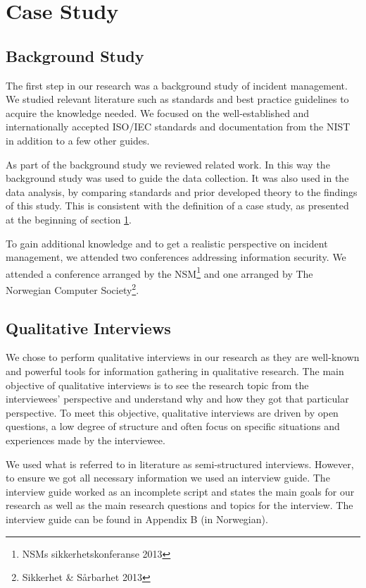 \section{Case Study}
\label{sec:caseStudy}


\subsection{Background Study}
\label{sec:background}
The first step in our research was a background study of incident management. We studied relevant literature such as standards and best practice guidelines to acquire the knowledge needed. We focused on the well-established and internationally accepted ISO/IEC standards and documentation from the \ac{NIST} in addition to a few other guides.

As part of the background study we reviewed related work. In this way the background study was used to guide the data collection. It was also used in the data analysis, by comparing standards and prior developed theory to the findings of this study. This is consistent with the definition of a case study, as presented at the beginning of section \ref{sec:caseStudy}.

To gain additional knowledge and to get a realistic perspective on incident management, we attended two conferences addressing information security. We attended a conference arranged by the \ac{NSM}\footnote{NSMs sikkerhetskonferanse 2013} and one arranged by The Norwegian Computer Society\footnote{Sikkerhet \& S\aa rbarhet 2013}.

\subsection{Qualitative Interviews}
\label{sec:interviews}
We chose to perform qualitative interviews in our research as they are well-known and powerful tools for information gathering in qualitative research\cite{myers2007qualitative}. The main objective of qualitative interviews is to see the research topic from the interviewees' perspective and understand why and how they got that particular perspective\cite{cassell2004essential}. To meet this objective, qualitative interviews are driven by open questions, a low degree of structure and often focus on specific situations and experiences made by the interviewee. 

We used what is referred to in literature as semi-structured interviews\cite{cassell2004essential}. However, to ensure we got all necessary information we used an interview guide. The interview guide worked as an incomplete script and states the main goals for our research as well as the main research questions and topics for the interview. The interview guide can be found in Appendix B (in Norwegian).

